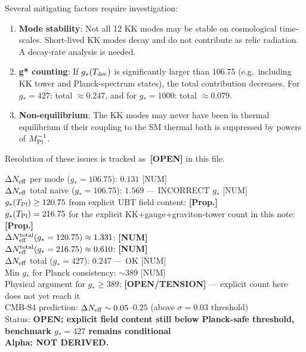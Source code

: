\documentclass[12pt,a4paper]{article}
\begin{document}
Several mitigating factors require investigation:
\begin{enumerate}
\item \textbf{Mode stability}: Not all 12 KK modes may be stable on cosmological
  time-scales.  Short-lived KK modes decay and do not contribute as
  relic radiation.  A decay-rate analysis is needed.
\item \textbf{g* counting}: If $g_*(T_{\rm dec})$ is significantly larger than
  106.75 (e.g.\ including KK tower and Planck-spectrum states),
  the total contribution decreases. For $g_* = 427$: total $\approx 0.247$,
  and for $g_*=1000$: total $\approx 0.079$.
\item \textbf{Non-equilibrium}: The KK modes may never have been in thermal
  equilibrium if their coupling to the SM thermal bath is suppressed
  by powers of $M_{\rm Pl}^{-1}$.
\end{enumerate}
Resolution of these issues is tracked as~\textbf{[OPEN]} in this file.

\begin{statusbox}
$\Delta N_{\rm eff}$ per mode ($g_*=106.75$): $0.131$ [NUM]\\
$\Delta N_{\rm eff}$ total naive ($g_*=106.75$): $1.569$ --- INCORRECT $g_*$ [NUM]\\
$g_*(T_{\rm Pl})\ge 120.75$ from explicit UBT field content: \textbf{[Prop.]}\\
$g_*(T_{\rm Pl})=216.75$ for the explicit KK+gauge+graviton-tower count in this note: \textbf{[Prop.]}\\
$\Delta N_{\rm eff}^{\rm total}(g_*=120.75)\approx1.331$: \textbf{[NUM]}\\
$\Delta N_{\rm eff}^{\rm total}(g_*=216.75)\approx0.610$: \textbf{[NUM]}\\
$\Delta N_{\rm eff}$ total ($g_*=427$): $0.247$ --- OK [NUM]\\
Min $g_*$ for Planck consistency: $\sim 389$ [NUM]\\
Physical argument for $g_*\geq 389$: \textbf{[OPEN/TENSION]} --- explicit count here does not yet reach it\\
CMB-S4 prediction: $\Delta N_{\rm eff}\sim 0.05$--$0.25$ (above $\sigma=0.03$ threshold)\\
Status: \textbf{OPEN; explicit field content still below Planck-safe threshold, benchmark $g_*=427$ remains conditional}\\
\textbf{Alpha: NOT DERIVED.}
\end{statusbox}
\end{document}
